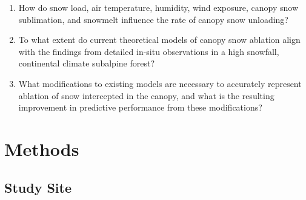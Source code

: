 \documentclass[
  letterpaper,
]{tex/uofsthesis-cs}
\begin{document}
\begin{enumerate}
\def\labelenumi{\arabic{enumi}.}
\item
  How do snow load, air temperature, humidity, wind exposure, canopy
  snow sublimation, and snowmelt influence the rate of canopy snow
  unloading?
\item
  To what extent do current theoretical models of canopy snow ablation
  align with the findings from detailed in-situ observations in a high
  snowfall, continental climate subalpine forest?
\item
  What modifications to existing models are necessary to accurately
  represent ablation of snow intercepted in the canopy, and what is the
  resulting improvement in predictive performance from these
  modifications?
\end{enumerate}

\section{Methods}\label{methods}

\subsection{Study Site}\label{study-site-1}
\end{document}
